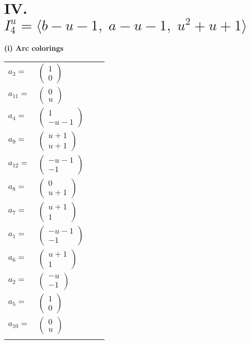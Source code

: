 \documentclass[1p]{elsarticle_modified}
\theoremstyle{definition}
\begin{document}
\centering \section*{IV. $I^u_{4}= \langle b- u-1,\;a- u-1,\;u^2+u+1 \rangle$}
\flushleft \textbf{(i) Arc colorings}\\
\begin{tabular}{m{7pt} m{180pt} m{7pt} m{180pt} }
\flushright $a_{3}=$&$\begin{pmatrix}1\\0\end{pmatrix}$ \\
\flushright $a_{11}=$&$\begin{pmatrix}0\\u\end{pmatrix}$ \\
\flushright $a_{4}=$&$\begin{pmatrix}1\\- u-1\end{pmatrix}$ \\
\flushright $a_{9}=$&$\begin{pmatrix}u+1\\u+1\end{pmatrix}$ \\
\flushright $a_{12}=$&$\begin{pmatrix}- u-1\\-1\end{pmatrix}$ \\
\flushright $a_{8}=$&$\begin{pmatrix}0\\u+1\end{pmatrix}$ \\
\flushright $a_{7}=$&$\begin{pmatrix}u+1\\1\end{pmatrix}$ \\
\flushright $a_{1}=$&$\begin{pmatrix}- u-1\\-1\end{pmatrix}$ \\
\flushright $a_{6}=$&$\begin{pmatrix}u+1\\1\end{pmatrix}$ \\
\flushright $a_{2}=$&$\begin{pmatrix}- u\\-1\end{pmatrix}$ \\
\flushright $a_{5}=$&$\begin{pmatrix}1\\0\end{pmatrix}$ \\
\flushright $a_{10}=$&$\begin{pmatrix}0\\u\end{pmatrix}$\\&\end{tabular}
\end{document}
